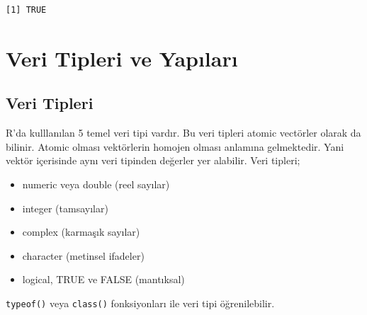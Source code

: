 \documentclass[
  letterpaper,
  DIV=11,
  numbers=noendperiod]{scrreprt}
\begin{document}
\begin{verbatim}
[1] TRUE
\end{verbatim}

\hypertarget{veri-tipleri-ve-yapux131larux131}{%
\chapter{Veri Tipleri ve
Yapıları}\label{veri-tipleri-ve-yapux131larux131}}

\hypertarget{veri-tipleri}{%
\section{Veri Tipleri}\label{veri-tipleri}}

R'da kulllanılan 5 temel veri tipi vardır. Bu veri tipleri atomic
vectörler olarak da bilinir. Atomic olması vektörlerin homojen olması
anlamına gelmektedir. Yani vektör içerisinde aynı veri tipinden değerler
yer alabilir. Veri tipleri;

\begin{itemize}
\item
  numeric veya double (reel sayılar)
\item
  integer (tamsayılar)
\item
  complex (karmaşık sayılar)
\item
  character (metinsel ifadeler)
\item
  logical, TRUE ve FALSE (mantıksal)
\end{itemize}

\texttt{typeof()} veya \texttt{class()} fonksiyonları ile veri tipi
öğrenilebilir.
\end{document}
